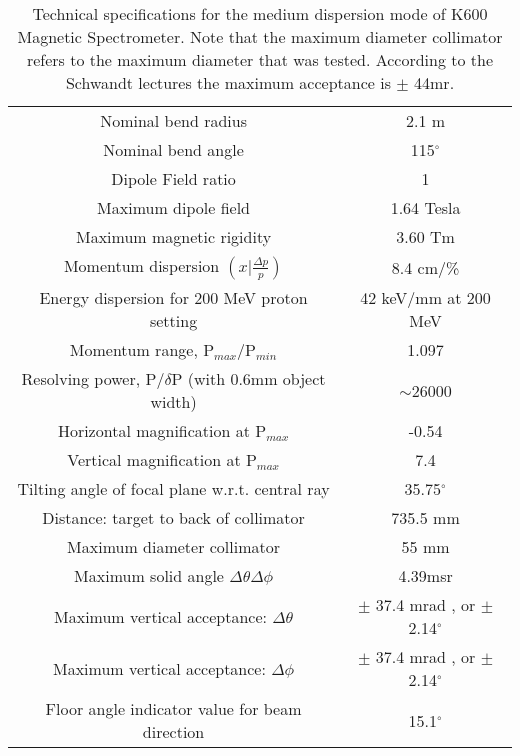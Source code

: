 \documentclass[11pt]{report}
\begin{document}
\begin{table}[!ht]
\centering
\begin{tabular}{c|c}
\hline
\hline
Nominal bend radius & 2.1 m\\
Nominal bend angle & 115$^{\circ}$\\
Dipole Field ratio & 1 \\
Maximum dipole field & 1.64 Tesla\\
Maximum magnetic rigidity & 3.60 Tm\\
Momentum dispersion $(x|\frac{\Delta p}{p})$ & 8.4 cm/\%\\
Energy dispersion for 200 MeV proton setting & 42 keV/mm at 200 MeV\\
Momentum range, P$_{max}$/P$_{min}$ & 1.097\\
Resolving power, P/$\delta$P (with 0.6mm object width) & $\sim$26000\\
Horizontal magnification at  P$_{max}$& -0.54\\
Vertical magnification at  P$_{max}$& 7.4\\
Tilting angle of focal plane w.r.t. central ray & 35.75$^{\circ}$\\
\hline
Distance: target to back of collimator & 735.5 mm\\
Maximum diameter collimator & 55 mm\\
Maximum solid angle $\Delta\theta\Delta\phi$ & 4.39msr\\
Maximum vertical acceptance: $\Delta\theta$ &  $\pm$ 37.4 mrad , or $\pm$ 2.14$^{\circ}$\\
Maximum vertical acceptance: $\Delta\phi$   &  $\pm$ 37.4 mrad , or $\pm$ 2.14$^{\circ}$\\
\hline
Floor angle indicator value for beam direction & 15.1$^{\circ}$\\
\hline
\hline
\end{tabular}
\caption{Technical specifications for the medium dispersion mode of K600 Magnetic Spectrometer.
Note that the maximum diameter collimator refers to the maximum diameter that was tested. 
According to the Schwandt lectures \cite{Sch86} the maximum acceptance is $\pm$ 44mr.}
\label{table:k600-specifications}
\end{table}
\end{document}
